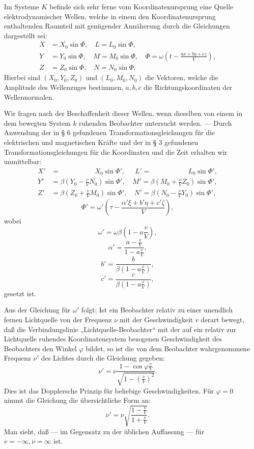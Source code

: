 \documentclass[17pt]{webarticle}       %
\begin{document}
Im Systeme \( K \) befinde sich sehr ferne vom Koordinatenursprung eine Quelle elektrodynamischer Wellen, welche in einem den Koordinatenursprung enthaltenden Raumteil mit genügender Annäherung durch die Gleichungen dargestellt sei:
\[
\begin{align*}
X &= X_0 \sin \Phi, \quad L = L_0 \sin \Phi,
\\
Y &= Y_0 \sin \Phi, \quad M = M_0 \sin \Phi, \quad \Phi = \omega \left( t - \frac{ax + by + cz}{V} \right),
\\
Z &= Z_0 \sin \Phi, \quad N = N_0 \sin \Phi,
\end{align*}
\]
Hierbei sind \( (X_0, Y_0, Z_0) \) und \( (L_0, M_0, N_0) \) die Vektoren, welche die Amplitude des Wellenzuges bestimmen, \( a, b, c \) die Richtungskoordinaten der Wellennormalen.

Wir fragen nach der Beschaffenheit dieser Wellen, wenn dieselben von einem in dem bewegten System \( k \) ruhenden Beobachter untersucht werden. — Durch Anwendung der in § 6 gefundenen Transformationsgleichungen für die elektrischen und magnetischen Kräfte und der in § 3 gefundenen Transformationsgleichungen für die Koordinaten und die Zeit erhalten wir unmittelbar:
\[
\begin{align*}
X' &= \qquad \qquad \quad X_0 \sin \Phi', \quad \ \ L' = \qquad \qquad \quad \ \, L_0 \sin \Phi',
\\
Y' &= \beta \left( Y_0 - \frac{v}{V} N_0 \right) \sin \Phi', \quad M' = \beta \left( M_0 + \frac{v}{V} Z_0 \right) \sin \Phi',
\\
Z' &= \beta \left( Z_0 + \frac{v}{V} M_0 \right) \sin \Phi', \quad N' = \beta \left( N_0 - \frac{v}{V} Y_0 \right) \sin \Phi',
\end{align*}
\]
\[
\Phi' = \omega' \left( \tau - \frac{\alpha' \xi + b' \eta + c' \zeta}{V} \right),
\]
wobei
\[
\omega' = \omega \beta \left( 1 - a \frac{v}{V} \right),
\]
\[
\alpha' = \frac{a - \frac{v}{V}}{1 - a \frac{v}{V}},
\]
\[
b' = \frac{b}{\beta \left( 1 - a \frac{v}{V} \right)},
\]
\[
c' = \frac{c}{\beta \left( 1 - a \frac{v}{V} \right)},
\]
gesetzt ist.

Aus der Gleichung für \(\omega'\) folgt: Ist ein Beobachter relativ zu einer unendlich fernen Lichtquelle von der Frequenz \( \nu \) mit der Geschwindigkeit \( v \) derart bewegt, daß die Verbindungslinie „Lichtquelle-Beobachter“ mit der auf ein relativ zur Lichtquelle ruhendes Koordinatensystem bezogenen Geschwindigkeit des Beobachters den Winkel \(\varphi\) bildet, so ist die von dem Beobachter wahrgenommene Frequenz \( \nu' \) des Lichtes durch die Gleichung gegeben:
\[
\nu' = \nu \frac{1 - \cos \varphi \frac{v}{V}}{\sqrt{1 - \left(\frac{v}{V}\right)^2}}.
\]
Dies ist das Dopplersche Prinzip für beliebige Geschwindigkeiten. Für \(\varphi = 0\) nimmt die Gleichung die übersichtliche Form an:
\[
\nu' = \nu \sqrt{\frac{1 - \frac{v}{V}}{1 + \frac{v}{V}}}.
\]
Man sieht, daß — im Gegensatz zu der üblichen Auffassung — für \( v = -\infty, \nu = \infty \) ist.
\end{document}
